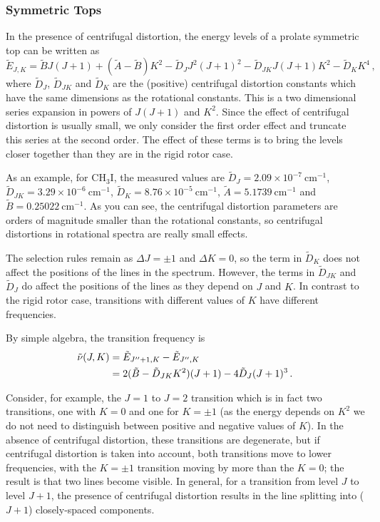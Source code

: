 \documentclass{article}
\theoremstyle{plain}\theoremheaderfont{\normalfont\itshape}\theorembodyfont{\rmfamily}\theoremseparator{.}\newtheorem*{rem}{Remark}\newtheorem*{ex}{Example}\newtheorem*{proof}{Proof}\newtheorem*{altp}{Alternative proof}
\theoremstyle{plain}\theoremheaderfont{\normalfont\bfseries}\theorembodyfont{\rmfamily}\theoremseparator{.}\newtheorem{thm}{Theorem}[section]\newtheorem{lem}[thm]{Lemma}\newtheorem{prop}[thm]{Proposition}\newtheorem*{cor}{Corollary}\newtheorem{defn}[thm]{Definition}\newtheorem{clm}[thm]{Claim}\newtheorem{clminproof}{Claim}\newtheorem{pos}{Postulate}[section]
\theoremstyle{break}\theoremheaderfont{\normalfont\itshape}\theorembodyfont{\rmfamily}\theoremseparator{.\medskip}\newtheorem*{proofskip}{Proof}\newtheorem*{exs}{Examples}\newtheorem*{rems}{Remarks}
\theoremstyle{break}\theoremheaderfont{\normalfont\bfseries}\theorembodyfont{\rmfamily}\theoremseparator{.\medskip}\newtheorem{lemskip}[thm]{Lemma}\newtheorem{defnskip}[thm]{Definition}\newtheorem{propskip}[thm]{Proposition}\newtheorem{thmskip}[thm]{Theorem}
\numberwithin{equation}{section}
\newcommand{\unit}[1]{\ \mathrm{#1}}
\begin{document}
    \subsubsection{Symmetric Tops}
    In the presence of centrifugal distortion, the energy levels of a prolate symmetric top can be written as
    \begin{equation}
        \tilde{E}_{J,K}=\tilde{B}J(J+1)+(\tilde{A}-\tilde{B})K^2-\tilde{D}_J J^2(J+1)^2-\tilde{D}_{JK}J(J+1)K^2-\tilde{D}_K K^4\,,
    \end{equation}
    where \(\tilde{D}_J\), \(\tilde{D}_{JK}\) and \(\tilde{D}_K\) are the (positive) centrifugal distortion constants which have the same dimensions as the rotational constants. This is a two dimensional series expansion in powers of \(J(J+1)\) and \(K^2\). Since the effect of centrifugal distortion is usually small, we only consider the first order effect and truncate this series at the second order. The effect of these terms is to bring the levels
    closer together than they are in the rigid rotor case.

    As an example, for \(\mathrm{CH_3I}\), the measured values are \(\tilde{D}_J=2.09\times 10^{-7}\unit{cm}^{-1}\), \(\tilde{D}_{JK}=3.29\times 10^{-6}\unit{cm}^{-1}\), \(\tilde{D}_K=8.76\times 10^{-5}\unit{cm}^{-1}\), \(\tilde{A}=5.1739\unit{cm}^{-1}\) and \(\tilde{B}=0.25022\unit{cm}^{-1}\). As you can see, the centrifugal distortion parameters are orders of magnitude smaller than the rotational constants, so centrifugal distortions in rotational spectra are really small effects.

    The selection rules remain as \(\Delta J=\pm 1\) and \(\Delta K=0\), so the term in \(\tilde{D}_K\) does not affect the positions of the lines in the spectrum. However, the terms in \(\tilde{D}_{JK}\) and \(\tilde{D}_J\) do affect the positions of the lines as they depend on \(J\) and \(K\). In contrast to the rigid rotor case, transitions with different values of \(K\) have different frequencies.

    By simple algebra, the transition frequency is
    \begin{align}
        \tilde{\nu}(J,K)&=\tilde{E}_{J''+1,K}-\tilde{E}_{J'',K}\notag\\
        &=2(\tilde{B}-\tilde{D}_{JK}K^2)(J+1)-4\tilde{D}_J(J+1)^3\,.
    \end{align}

    Consider, for example, the \(J=1\) to \(J=2\) transition which is in fact two transitions, one with \(K=0\) and one for \(K=\pm 1\) (as the energy depends on \(K^2\) we do not need to distinguish between positive and negative values of \(K\)). In the absence of centrifugal distortion, these transitions are degenerate, but if centrifugal distortion is taken into account, both transitions move to lower frequencies, with the \(K=\pm 1\) transition moving by more than the \(K=0\); the result is that two lines become visible. In general, for a transition from level \(J\) to level \(J+1\), the presence of centrifugal distortion results in the line splitting into (\(J + 1\)) closely-spaced components.
\end{document}
